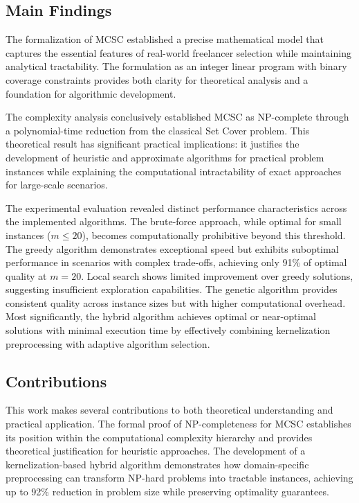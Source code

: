 \documentclass[12pt,a4paper]{article}
\begin{document}
\subsection{Main Findings}
\label{subsec:main-findings}

The formalization of MCSC established a precise mathematical model that captures the essential features of real-world freelancer selection while maintaining analytical tractability. The formulation as an integer linear program with binary coverage constraints provides both clarity for theoretical analysis and a foundation for algorithmic development.

The complexity analysis conclusively established MCSC as NP-complete through a polynomial-time reduction from the classical Set Cover problem. This theoretical result has significant practical implications: it justifies the development of heuristic and approximate algorithms for practical problem instances while explaining the computational intractability of exact approaches for large-scale scenarios.

The experimental evaluation revealed distinct performance characteristics across the implemented algorithms. The brute-force approach, while optimal for small instances ($m \leq 20$), becomes computationally prohibitive beyond this threshold. The greedy algorithm demonstrates exceptional speed but exhibits suboptimal performance in scenarios with complex trade-offs, achieving only 91\% of optimal quality at $m=20$. Local search shows limited improvement over greedy solutions, suggesting insufficient exploration capabilities. The genetic algorithm provides consistent quality across instance sizes but with higher computational overhead. Most significantly, the hybrid algorithm achieves optimal or near-optimal solutions with minimal execution time by effectively combining kernelization preprocessing with adaptive algorithm selection.

\subsection{Contributions}
\label{subsec:contributions}

This work makes several contributions to both theoretical understanding and practical application. The formal proof of NP-completeness for MCSC establishes its position within the computational complexity hierarchy and provides theoretical justification for heuristic approaches. The development of a kernelization-based hybrid algorithm demonstrates how domain-specific preprocessing can transform NP-hard problems into tractable instances, achieving up to 92\% reduction in problem size while preserving optimality guarantees.
\end{document}
